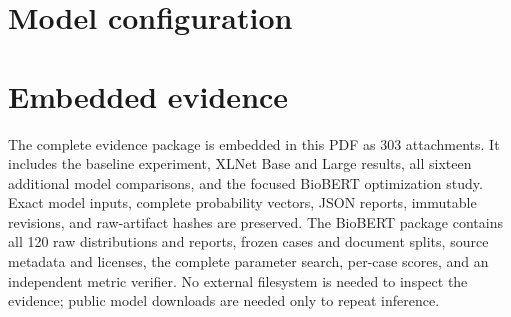 \documentclass[11pt,a4paper]{article}
\begin{document}
\section{Model configuration}


\section{Embedded evidence}
The complete evidence package is embedded in this PDF as 303 attachments. It includes the baseline experiment, XLNet Base and Large results, all sixteen additional model comparisons, and the focused BioBERT optimization study. Exact model inputs, complete probability vectors, JSON reports, immutable revisions, and raw-artifact hashes are preserved. The BioBERT package contains all 120 raw distributions and reports, frozen cases and document splits, source metadata and licenses, the complete parameter search, per-case scores, and an independent metric verifier. No external filesystem is needed to inspect the evidence; public model downloads are needed only to repeat inference.
\end{document}
